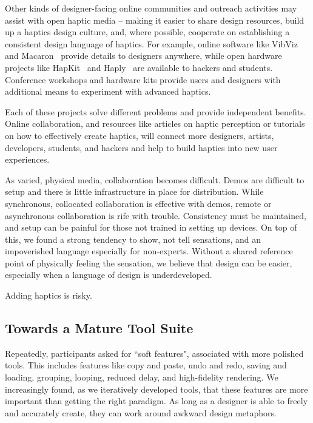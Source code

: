     Other kinds of designer-facing online communities and outreach activities may assist with open haptic media -- making it easier to share design resources,  build up a haptics design culture, and, where possible, cooperate on establishing a consistent design language of haptics. 
%
    For example, online software like VibViz~\cite{seifi2015vibviz} and Macaron~\cite{schneider2015tactile} provide details to designers anywhere, while open hardware projects like HapKit~\cite{Martinez2016} and Haply~\cite{Gallacher2016} are available to hackers and students.
    Conference workshops and hardware kits provide users and designers with additional means to experiment with advanced haptics.
    
    Each of these projects solve different problems and provide independent benefits.
    Online collaboration, and resources like articles on haptic perception or tutorials on how to effectively create haptics, will connect more designers, artists, developers, students, and hackers and help to build haptics into new user experiences.



As varied, physical media, collaboration becomes difficult.
Demos are difficult to setup and there is little infrastructure in place for distribution.
While synchronous, collocated collaboration is effective with demos, remote or asynchronous collaboration is rife with trouble.
Consistency must be maintained, and setup can be painful for those not trained in setting up devices.
On top of this, we found a strong tendency to show, not tell sensations, and an impoverished language especially for non-experts.
Without a shared reference point of physically feeling the sensation, we believe that design can be easier, especially when a language of design is underdeveloped.


Adding haptics is risky.




%
%
\subsection{Towards a Mature \haxd Tool Suite}
Repeatedly, participants asked for ``soft features", associated with more polished tools.
This includes features like copy and paste, undo and redo, saving and loading, grouping, looping, reduced delay, and high-fidelity rendering.
We increasingly found, as we iteratively developed \haxd tools, that these features are more important than getting the right paradigm.
As long as a designer is able to freely and accurately create, they can work around awkward design metaphors.

